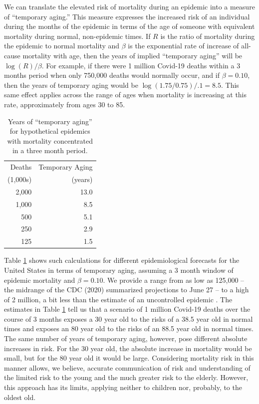 \documentclass[9pt,twocolumn,twoside,lineno]{pnas-new}
\begin{document}
We can translate the elevated risk of mortality during an epidemic
into a measure of ``temporary aging.'' This measure expresses the
increased risk of an individual during the months of the epidemic in
terms of the age of someone with equivalent mortality during normal,
non-epidemic times. If $R$ is the ratio of mortality during the
epidemic to normal mortality and $\beta$ is the exponential rate of
increase of all-cause mortality with age, then the years of implied
``temporary aging'' will be $\log(R)/\beta$. For example, if there
were 1 million Covid-19 deaths within a 3 months period when only
750,000 deaths would normally occur, and if $\beta = 0.10$, then the
years of temporary aging would be $\log(1.75/0.75)/.1 = 8.5$. This
same effect applies across the range of ages when mortality is
increasing at this rate, approximately from ages 30 to 85.


\begin{table}[h]%
\centering
\caption{Years of ``temporary aging'' for hypothetical epidemics with
  mortality concentrated in a three month period.}
\label{tbl:aging}
\begin{tabular}{rr}
  Deaths & Temporary Aging \\
  (1,000s) & (years) \\
\midrule
  2,000 & 13.0 \\
  1,000 & 8.5 \\
  500  & 5.1 \\
  250  & 2.9 \\
  125 & 1.5 \\ 
\bottomrule
\end{tabular}

\end{table}


Table \ref{tbl:aging} shows such calculations for different
epidemiological forecasts for the United States in terms of temporary
aging, assuming a 3 month window of epidemic mortality and
$\beta = 0.10$. We provide a range from as low as 125,000 -- the
midrange of the CDC (2020) summarized projections to June 27 -- to a
high of 2 million, a bit less than the estimate of an uncontrolled
epidemic \cite{ferguson:2020}. The estimates in Table \ref{tbl:aging}
tell us that a scenario of 1 million Covid-19 deaths over the course
of 3 months exposes a 30 year old to the risks of a 38.5 year old in
normal times and exposes an 80 year old to the risks of an 88.5 year
old in normal times. The same number of years of temporary aging,
however, pose different absolute increases in risk. For the 30 year
old, the absolute increase in mortality would be small, but for the 80
year old it would be large. Considering mortality risk in this manner allows,
we believe, accurate communication of risk and understanding of the
limited risk to the young and the much greater risk to the elderly.
However, this approach has its limits, applying neither to
children nor, probably, to the oldest old.
\end{document}
